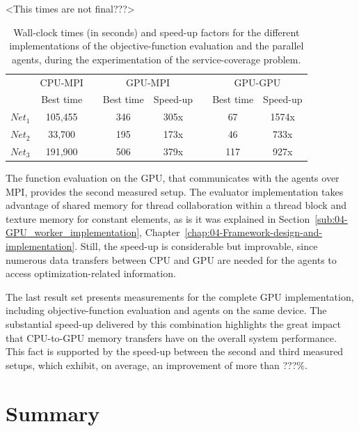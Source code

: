 \begin{table}
\caption{Wall-clock times (in seconds) and speed-up factors for the different
implementations of the objective-function evaluation and the parallel
agents, during the experimentation of the service-coverage problem.\label{tab:06-Performance_analysis}}


\centering

<This times are not final???>

\begin{tabular}{cccccccc}
\toprule 
 & \multicolumn{1}{c}{CPU-MPI} &  & \multicolumn{2}{c}{GPU-MPI} &  & \multicolumn{2}{c}{GPU-GPU}\tabularnewline\addlinespace
\cmidrule{2-2} \cmidrule{4-5} \cmidrule{7-8} 
 & Best time &  & Best time & Speed-up &  & Best time & Speed-up\tabularnewline\addlinespace
\cmidrule{1-2} \cmidrule{4-5} \cmidrule{7-8} 
$Net_{1}$ & 105,455 &  & 346 & 305x &  & 67 & 1574x\tabularnewline
$Net_{2}$ & 33,700 &  & 195 & 173x &  & 46 & 733x\tabularnewline
$Net_{3}$ & 191,900 &  & 506 & 379x &  & 117 & 927x\tabularnewline
\bottomrule
\end{tabular}
\end{table}


The function evaluation on the GPU, that communicates with the agents
over MPI, provides the second measured setup. The evaluator implementation
takes advantage of shared memory for thread collaboration within a
thread block and texture memory for constant elements, as is it was
explained in Section~\ref{sub:04-GPU_worker_implementation}, Chapter~\ref{chap:04-Framework-design-and-implementation}.
Still, the speed-up is considerable but improvable, since numerous
data transfers between CPU and GPU are needed for the agents to access
optimization-related information.

The last result set presents measurements for the complete GPU implementation,
including objective-function evaluation and agents on the same device.
The substantial speed-up delivered by this combination highlights
the great impact that CPU-to-GPU memory transfers have on the overall
system performance. This fact is supported by the speed-up between
the second and third measured setups, which exhibit, on average, an
improvement of more than ???\%.

\clearpage{}


\section{Summary}

